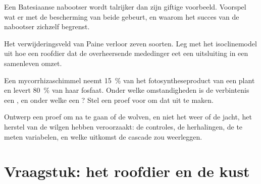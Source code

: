 \begin{exercise}[$\star\star$]\label{exo:b1:species-interactions:9}
Een Batesiaanse nabootser wordt talrijker dan zijn giftige voorbeeld.
Voorspel wat er met de bescherming van beide gebeurt, en waarom het succes
van de nabootser zichzelf begrenst.
\end{exercise}

\begin{exercise}[$\star\star\star$]\label{exo:b1:species-interactions:10}
Het verwijderingsveld van Paine verloor zeven soorten. Leg met het
isoclinemodel uit hoe een roofdier dat de overheersende mededinger eet een
uitsluiting in een samenleven omzet.
\end{exercise}

\begin{exercise}[$\star\star\star$]\label{exo:b1:species-interactions:11}
Een mycorrhizaschimmel neemt \qty{15}{\%} van het fotosyntheseproduct van een
plant en levert \qty{80}{\%} van haar fosfaat. Onder welke omstandigheden is
de verbintenis een , en onder welke een ? Stel een proef
voor om dat uit te maken.
\end{exercise}

\begin{exercise}[$\star\star\star$]\label{exo:b1:species-interactions:12}
Ontwerp een proef om na te gaan of de wolven, en niet het weer of de jacht,
het herstel van de wilgen hebben veroorzaakt: de controles, de herhalingen,
de te meten variabelen, en welke uitkomst de cascade zou weerleggen.
\end{exercise}

\section{Vraagstuk: het roofdier en de kust}

